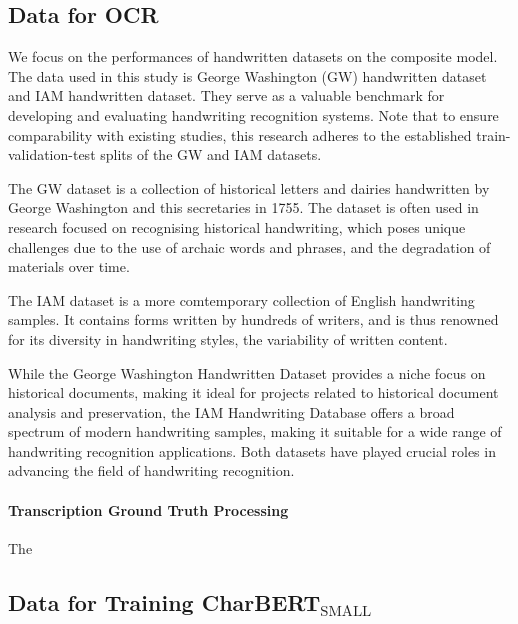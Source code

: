 \subsection{Data for OCR} 
\label{subsec:3_data_for_ocr}
We focus on the performances of handwritten datasets on the composite model. The data used in this study is George Washington (GW) handwritten dataset and IAM handwritten dataset. They serve as a valuable benchmark for developing and evaluating handwriting recognition systems. Note that to ensure comparability with existing studies, this research adheres to the established train-validation-test splits of the GW and IAM datasets. 

The GW dataset is a collection of historical letters and dairies handwritten by George Washington and this secretaries in 1755. The dataset is often used in research focused on recognising historical handwriting, which poses unique challenges due to the use of archaic words and phrases, and the degradation of materials over time.

The IAM dataset is a more comtemporary collection of English handwriting samples. It contains forms written by hundreds of writers, and is thus renowned for its diversity in handwriting styles, the variability of written content. 

While the George Washington Handwritten Dataset provides a niche focus on historical documents, making it ideal for projects related to historical document analysis and preservation, the IAM Handwriting Database offers a broad spectrum of modern handwriting samples, making it suitable for a wide range of handwriting recognition applications. Both datasets have played crucial roles in advancing the field of handwriting recognition. 
\paragraph*{Transcription Ground Truth Processing}
\label{par:3_transcription_gound_truth_processing}
The 
\subsection{Data for Training CharBERT$_{\text{SMALL}}$}
\label{subsec:3_data_for_training_charbert}
